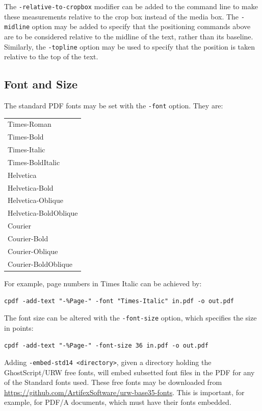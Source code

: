 \documentclass{book}
\begin{document}
The \texttt{-relative-to-cropbox} modifier can be added to the command line to
make these measurements relative to the crop box instead of the media box. The \texttt{-midline} option may be added to specify that the positioning
commands above are to be considered relative to the midline of the text, rather
than its baseline. Similarly, the \texttt{-topline} option may be used to specify that the position is taken relative to the top of the text.

  \subsection{Font and Size}
  The standard PDF fonts may be set with the \texttt{-font} option. They are:

  \vspace{2mm}
  \begin{tabular}{l}
  Times-Roman\\
  Times-Bold\\
  Times-Italic\\
  Times-BoldItalic\\
  Helvetica\\
  Helvetica-Bold\\
  Helvetica-Oblique\\
  Helvetica-BoldOblique\\
  Courier\\
  Courier-Bold\\
  Courier-Oblique\\
  Courier-BoldOblique
  \end{tabular}
 \vspace{2mm}

  \noindent For example, page numbers in Times Italic can be achieved by:
  \begin{framed}
    \noindent\small\verb!cpdf -add-text "-%Page-" -font "Times-Italic" in.pdf -o out.pdf!
  \end{framed}

\noindent The font size can be altered with the \texttt{-font-size} option, which
specifies the size in points:
  \begin{framed}
    \noindent\small\verb!cpdf -add-text "-%Page-" -font-size 36 in.pdf -o out.pdf!
  \end{framed}

  \noindent Adding \texttt{-embed-std14 <directory>}, given a directory holding the GhostScript/URW free fonts, will embed subsetted font files in the PDF for any of the Standard fonts used. These free fonts may be downloaded from \url{https://github.com/ArtifexSoftware/urw-base35-fonts}. This is important, for example, for PDF/A documents, which must have their fonts embedded.
\end{document}
